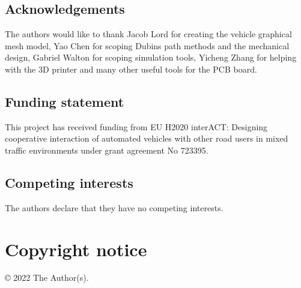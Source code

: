 \documentclass[a4paper]{article}
\begin{document}
\subsection{Acknowledgements}\label{h.gu3yyarx72d6}

	The authors would like to thank Jacob Lord for creating the vehicle graphical mesh model, Yao Chen for scoping Dubins path methods and the mechanical design, Gabriel Walton for scoping simulation tools, Yicheng Zhang for helping with the 3D printer and many other useful tools for the PCB board.


\subsection{Funding statement}\label{h.4u1a7tugh2om}


	This project has received funding from EU H2020 interACT: Designing cooperative interaction of automated vehicles with other road users in mixed traffic environments under grant agreement No 723395.


\subsection{Competing interests}\label{h.q1j1rznb43fl}

The authors declare that they have no competing interests.




	
	


\section{Copyright notice}\label{h.jm5gcqv4g8x0}

© 2022 The Author(s). %
\end{document}
